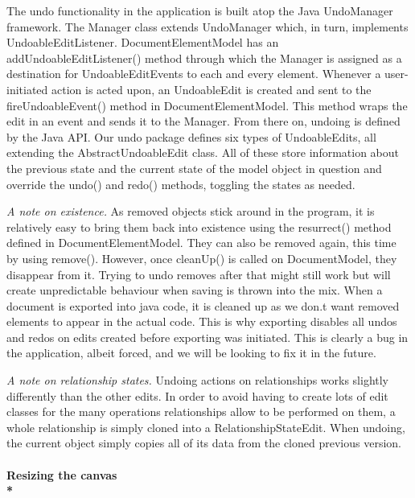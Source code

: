 \hspace{-10pt} The undo functionality in the application is built atop the Java UndoManager framework. The Manager class extends UndoManager which, in turn, implements UndoableEditListener. DocumentElementModel has an addUndoableEditListener() method through which the Manager is assigned as a destination for UndoableEditEvents  to each and every element. Whenever a user-initiated action is acted upon, an UndoableEdit is created and sent to the fireUndoableEvent() method in DocumentElementModel. This method wraps the edit in an event and sends it to the Manager. From there on, undoing is defined by the Java API. Our undo package defines six types of UndoableEdits, all extending the AbstractUndoableEdit class. All of these store information about the previous state and the current state of the model object in question and override the undo() and redo() methods, toggling the states as needed. 

\emph{A note on existence.} As removed objects stick around in the program, it is relatively easy to bring them back into existence using the resurrect() method defined in DocumentElementModel. They can also be removed again, this time by using remove(). However, once cleanUp() is called on DocumentModel, they disappear from it. Trying to undo removes after that might still work but will create unpredictable behaviour when saving is thrown into the mix. When a document is exported into java code, it is cleaned up as we don.t want removed elements to appear in the actual code. This is why exporting disables all undos and redos on edits created before exporting was initiated. This is clearly a bug in the application, albeit forced, and we will be looking to fix it in the future. 

\emph{A note on relationship states.} Undoing actions on relationships works slightly differently than the other edits. In order to avoid having to create lots of edit classes for the many operations relationships allow to be performed on them, a whole relationship is simply cloned into a RelationshipStateEdit. When undoing, the current object simply copies all of its data from the cloned previous version.  

\vspace{-5pt}\paragraph{\small{\tab Resizing the canvas\\*}}


